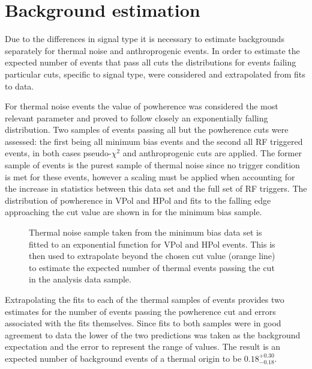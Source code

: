\section{Background estimation}
\label{sec:Analysis:Background-Estimation}

Due to the differences in signal type it is necessary to estimate backgrounds separately for thermal noise and anthroprogenic events. In order to estimate the expected number of events that pass all cuts the distributions for events failing particular cuts, specific to signal type, were considered and extrapolated from fits to data.

For thermal noise events the value of powherence was considered the most relevant parameter and proved to follow closely an exponentially falling distribution. Two samples of events passing all but the powherence cuts were assessed: the first being all minimum bias events and the second all RF triggered events, in both cases pseudo-$\chi^{2}$ and anthroprogenic cuts are applied. The former sample of events is the purest sample of thermal noise since no trigger condition is met for these events, however a scaling must be applied when accounting for the increase in statistics between this data set and the full set of RF triggers. The distribution of powherence in VPol and HPol and fits to the falling edge approaching the cut value are shown in  for the minimum bias sample. 

\begin{figure}[htpb]
\hfill
{}
\caption{Thermal noise sample taken from the minimum bias data set is fitted to an exponential function for VPol and HPol events. This is then used to extrapolate beyond the chosen cut value (orange line) to estimate the expected number of thermal events passing the cut in the analysis data sample.}
\label{fig:Analysis:Background-Estimation:Thermal-Background}
\end{figure}

Extrapolating the fits to each of the thermal samples of events provides two estimates for the number of events passing the powherence cut and errors associated with the fits themselves. Since fits to both samples were in good agreement to data the lower of the two predictions was taken as the background expectation and the error to represent the range of values. The result is an expected number of background events of a thermal origin to be $0.18^{+0.30}_{-0.18}$.

